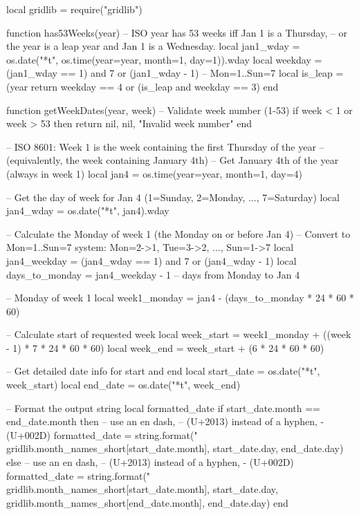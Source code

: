 \documentclass{article}
\begin{document}
\thispagestyle{empty}

\begin{luacode*}
local gridlib = require("gridlib")

function has53Weeks(year)
    -- ISO year has 53 weeks iff Jan 1 is a Thursday,
    -- or the year is a leap year and Jan 1 is a Wednesday.
    local jan1_wday = os.date("*t", os.time({year=year, month=1, day=1})).wday
    local weekday = (jan1_wday == 1) and 7 or (jan1_wday - 1)  -- Mon=1..Sun=7
    local is_leap = (year %
    return weekday == 4 or (is_leap and weekday == 3)
end

function getWeekDates(year, week)
    -- Validate week number (1-53)
    if week < 1 or week > 53 then
        return nil, nil, "Invalid week number"
    end

    -- ISO 8601: Week 1 is the week containing the first Thursday of the year
    -- (equivalently, the week containing January 4th)
    -- Get January 4th of the year (always in week 1)
    local jan4 = os.time({year=year, month=1, day=4})

    -- Get the day of week for Jan 4 (1=Sunday, 2=Monday, ..., 7=Saturday)
    local jan4_wday = os.date("*t", jan4).wday

    -- Calculate the Monday of week 1 (the Monday on or before Jan 4)
    -- Convert to Mon=1..Sun=7 system: Mon=2->1, Tue=3->2, ..., Sun=1->7
    local jan4_weekday = (jan4_wday == 1) and 7 or (jan4_wday - 1)
    local days_to_monday = jan4_weekday - 1  -- days from Monday to Jan 4

    -- Monday of week 1
    local week1_monday = jan4 - (days_to_monday * 24 * 60 * 60)

    -- Calculate start of requested week
    local week_start = week1_monday + ((week - 1) * 7 * 24 * 60 * 60)
    local week_end = week_start + (6 * 24 * 60 * 60)

    -- Get detailed date info for start and end
    local start_date = os.date("*t", week_start)
    local end_date = os.date("*t", week_end)

    -- Format the output string
    local formatted_date
    if start_date.month == end_date.month then
        -- use an en dash, – (U+2013) instead of a hyphen, - (U+002D)
        formatted_date = string.format("%
            gridlib.month_names_short[start_date.month],
            start_date.day,
            end_date.day)
    else
        -- use an en dash, – (U+2013) instead of a hyphen, - (U+002D)
        formatted_date = string.format("%
            gridlib.month_names_short[start_date.month],
            start_date.day,
            gridlib.month_names_short[end_date.month],
            end_date.day)
    end


\end{luacode*}
\end{document}
